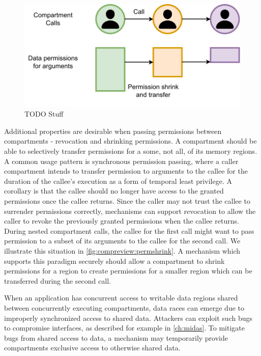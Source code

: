 \begin{figure}
      \centering
      \includegraphics[width=0.75\linewidth]{media/compreview/permission_shrink_grant.pdf}
      \caption{TODO Stuff}
      \label{fig:compreview:permshrink}
\end{figure}
Additional properties are desirable when passing
permissions between compartments - revocation and shrinking permissions.
A compartment should be able to selectively transfer permissions for a 
some, not all, of its memory regions.
A common usage pattern is synchronous permission passing, where a caller
compartment intends to transfer permission to arguments to the callee for the
duration of the callee's execution as a form of temporal least privilege.
A corollary is that the callee should no longer have access to the granted
permissions once the callee returns.
Since the caller may not trust the callee to surrender permissions correctly, 
mechanisms can support revocation to allow the caller to revoke the previously
granted permissions when the callee returns.
During nested compartment calls, the callee for the first call might want to pass
permission to a subset of its arguments to the callee for the second call.
We illustrate this situation in \autoref{fig:compreview:permshrink}.
A mechanism which supports this paradigm securely should allow a compartment to
shrink permissions for a region to create permissions for a smaller region
which can be transferred during the second call. 

When an application has concurrent access to writable data regions shared 
between concurrently executing compartments, data races can emerge due to
improperly synchronized access to shared data.
Attackers can exploit such bugs to compromise interfaces, as described for
example in \autoref{ch:midas}.
To mitigate bugs from shared access to data, a mechanism may temporarily provide
compartments exclusive access to otherwise shared data.

